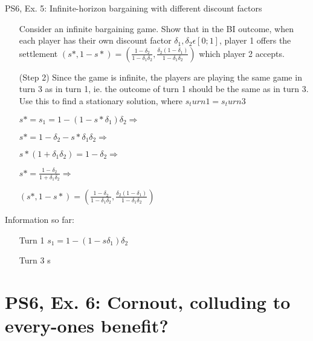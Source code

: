 \begin{frame}{PS6, Ex. 5: Infinite-horizon bargaining with different discount factors}
    \begin{itemize}
    \item[] Consider an infinite bargaining game. Show that in the BI outcome, when each player has their own discount factor $\delta_1,\delta_2 \epsilon [0;1]$, player 1 offers the settlement $ (s*,1-s*)= \left( \frac{1-\delta_2}{1-\delta_1\delta_2},\frac{\delta_2(1-\delta_1)}{1-\delta_1\delta_2}\right)$ which player 2 accepts.
    \item[(Step 2)] Since the game is infinite, the players are playing the same game in turn 3 as in turn 1, ie. the outcome of turn 1 should be the same as in turn 3. Use this to find a stationary solution, where $s_turn1=s_turn3$
    \end{itemize}
    \vfill\null
  \begin{multicols}{2}
    \begin{itemize}
        \item[] $s*=s_1 = 1- (1-s*\delta_1)\delta_2 \Rightarrow$
        \item[] $s*= 1-\delta_2-s*\delta_1\delta_2 \Rightarrow$
        \item[] $s*(1+\delta_1\delta_2)= 1-\delta_2 \Rightarrow$
        \item[] $s*= \frac{1-\delta_2}{1+\delta_1\delta_2} \Rightarrow$
        \item[] $ (s*,1-s*)= \left( \frac{1-\delta_2}{1-\delta_1\delta_2},\frac{\delta_2(1-\delta_1)}{1-\delta_1\delta_2}\right)$
    \end{itemize}
    \vfill\null \columnbreak
    Information so far:
    \begin{itemize}
    \item[Turn 1] $s_1 = 1- (1-s\delta_1)\delta_2$\\
    \item[Turn 3] s\\
    \end{itemize}
    \vfill\null 
  \end{multicols}
    \vfill\null 
\end{frame}

\section{PS6, Ex. 6: Cornout, colluding to every-ones benefit?}

